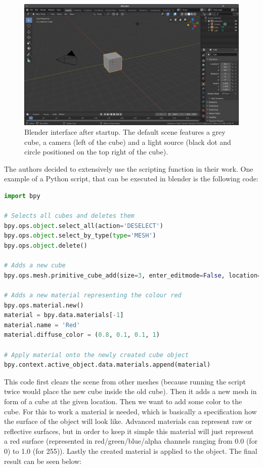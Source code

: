 \begin{figure}[h!]
	\centering
	\includegraphics[width=6.5in]{img/methodology_generatingData_blender_startscreen.png}
	\caption{Blender interface after startup. The default scene features a grey cube, a camera (left of the cube) and a light source (black dot and circle positioned on the top right of the cube).}
	\label{pic:methodology_generatingData_blender_startscreen}
\end{figure}

The authors decided to extensively use the scripting function in their work. One example of a Python script, that can be executed in blender is the following code:

\begin{lstlisting}[language=python]
import bpy

# Selects all cubes and deletes them
bpy.ops.object.select_all(action='DESELECT')
bpy.ops.object.select_by_type(type='MESH')
bpy.ops.object.delete()

# Adds a new cube
bpy.ops.mesh.primitive_cube_add(size=3, enter_editmode=False, location=(4, 2, 0))

# Adds a new material representing the colour red
bpy.ops.material.new()
material = bpy.data.materials[-1]
material.name = 'Red'
material.diffuse_color = (0.8, 0.1, 0.1, 1)

# Apply material onto the newly created cube object
bpy.context.active_object.data.materials.append(material)
\end{lstlisting}

This code first clears the scene from other meshes (because running the script twice would place the new cube inside the old cube). Then it adds a new mesh in form of a cube at the given location. Then we want to add some color to the cube. For this to work a material is needed, which is basically a specification how the surface of the object will look like. Advanced materials can represent raw or reflective surfaces, but in order to keep it simple this material will just represent a red surface (represented in red/green/blue/alpha channels ranging from 0.0 (for 0) to 1.0 (for 255)). Lastly the created material is applied to the object. The final result can be seen below:

